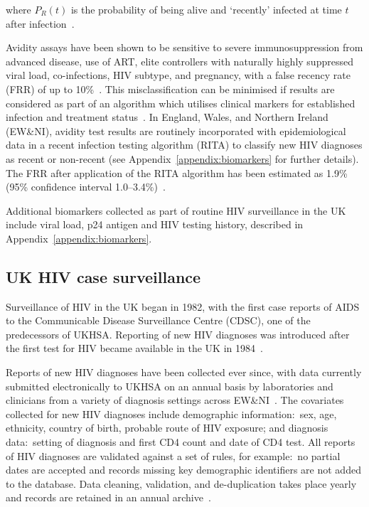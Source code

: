 where $P_R(t)$ is the probability of being alive and `recently' infected at time $t$ after infection~\parencite{Kassanjee2012-uj}.

Avidity assays have been shown to be sensitive to severe immunosuppression from advanced disease, use of ART, elite controllers with naturally highly suppressed viral load, co-infections, HIV subtype, and pregnancy, with a false recency rate (FRR) of up to 10\%~\parencite{Suligoi2011-xs}. This misclassification can be minimised if results are considered as part of an algorithm which utilises clinical markers for established infection and treatment status~\parencite{Aghaizu2014-hl}. In England, Wales, and Northern Ireland (EW\&NI), avidity test results are routinely incorporated with epidemiological data in a recent infection testing algorithm (RITA) to classify new HIV diagnoses as recent or non-recent (see Appendix~\ref{appendix:biomarkers} for further details). The FRR after application of the RITA algorithm has been estimated as 1.9\% (95\% confidence interval 1.0--3.4\%)~\parencite{Aghaizu2018-kk}.

Additional biomarkers collected as part of routine HIV surveillance in the UK include viral load, p24 antigen and HIV testing history, described in Appendix~\ref{appendix:biomarkers}.

\subsection{UK HIV case surveillance}\label{sec:hiv-surveillance}

Surveillance of HIV in the UK began in 1982, with the first case reports of AIDS to the Communicable Disease Surveillance Centre (CDSC), one of the predecessors of UKHSA\@. Reporting of new HIV diagnoses was introduced after the first test for HIV became available in the UK in 1984~\parencite{British_Broadcasting_Company1984-sk}.

Reports of new HIV diagnoses have been collected ever since, with data currently submitted electronically to UKHSA on an annual basis by laboratories and clinicians from a variety of diagnosis settings across EW\&NI~\parencite{Rice2017-pr}. The covariates collected for new HIV diagnoses include demographic information:\ sex, age, ethnicity, country of birth, probable route of HIV exposure; and diagnosis data:\ setting of diagnosis and first CD4 count and date of CD4 test. All reports of HIV diagnoses are validated against a set of rules, for example:\ no partial dates are accepted and records missing key demographic identifiers are not added to the database. Data cleaning, validation, and de-duplication takes place yearly and records are retained in an annual archive~\parencite{Public_Health_England2013-ma}.

